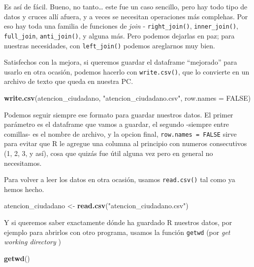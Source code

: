 \documentclass[]{book}
\newenvironment{Shaded}{\begin{snugshade}}{\end{snugshade}}
\newcommand{\KeywordTok}[1]{\textcolor[rgb]{0.13,0.29,0.53}{\textbf{#1}}}
\newcommand{\DataTypeTok}[1]{\textcolor[rgb]{0.13,0.29,0.53}{#1}}
\newcommand{\StringTok}[1]{\textcolor[rgb]{0.31,0.60,0.02}{#1}}
\newcommand{\OtherTok}[1]{\textcolor[rgb]{0.56,0.35,0.01}{#1}}
\newcommand{\NormalTok}[1]{#1}
\begin{document}
Es así de fácil. Bueno, no tanto\ldots{} este fue un caso sencillo, pero
hay todo tipo de datos y cruces allí afuera, y a veces se necesitan
operaciones más complehas. Por eso hay toda una familia de funciones de
\emph{join} - \texttt{right\_join()}, \texttt{inner\_join()},
\texttt{full\_join}, \texttt{anti\_join()}, y alguna más. Pero podemos
dejarlas en paz; para nuestras necesidades, con \texttt{left\_join()}
podemos areglarnos muy bien.

Satisfechos con la mejora, si queremos guardar el dataframe ``mejorado''
para usarlo en otra ocasión, podemos hacerlo con \texttt{write.csv()},
que lo convierte en un archivo de texto que queda en nuestra PC.

\begin{Shaded}
\begin{Highlighting}[]
\KeywordTok{write.csv}\NormalTok{(atencion_ciudadano, }\StringTok{"atencion_ciudadano.csv"}\NormalTok{, }\DataTypeTok{row.names =} \OtherTok{FALSE}\NormalTok{)}
\end{Highlighting}
\end{Shaded}

Podemos seguir siempre ese formato para guardar nuestros datos. El
primer parámetro es el dataframe que vamos a guardar, el segundo
-siempre entre comillas- es el nombre de archivo, y la opcion final,
\texttt{row.names\ =\ FALSE} sirve para evitar que R le agregue una
columna al principio con numeros consecutivos (1, 2, 3, y así), cosa que
quizás fue útil alguna vez pero en general no necesitamos.

Para volver a leer los datos en otra ocasión, usamos \texttt{read.csv()}
tal como ya hemos hecho.

\begin{Shaded}
\begin{Highlighting}[]
\NormalTok{atencion_ciudadano <-}\StringTok{ }\KeywordTok{read.csv}\NormalTok{(}\StringTok{"atencion_ciudadano.csv"}\NormalTok{)}
\end{Highlighting}
\end{Shaded}

Y si queremos saber exactamente dónde ha guardado R nuestros datos, por
ejemplo para abrirlos con otro programa, usamos la función
\texttt{getwd} (por \emph{get working directory} )

\begin{Shaded}
\begin{Highlighting}[]
\KeywordTok{getwd}\NormalTok{()}
\end{Highlighting}
\end{Shaded}
\end{document}
